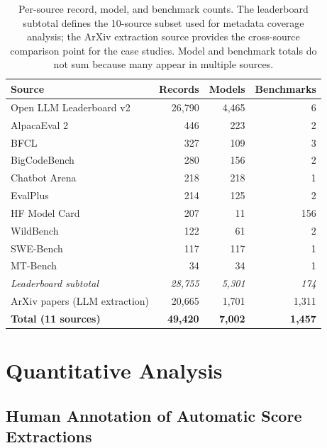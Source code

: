 \documentclass[11pt]{article}
\begin{document}
\begin{table}[t]
\centering
\small
\begin{tabular}{lrrr}
\toprule
Source & Records & Models & Benchmarks \\
\midrule
Open LLM Leaderboard v2 & 26{,}790 & 4{,}465 & 6 \\
AlpacaEval 2 & 446 & 223 & 2 \\
BFCL & 327 & 109 & 3 \\
BigCodeBench & 280 & 156 & 2 \\
Chatbot Arena & 218 & 218 & 1 \\
EvalPlus & 214 & 125 & 2 \\
HF Model Card & 207 & 11 & 156 \\
WildBench & 122 & 61 & 2 \\
SWE-Bench & 117 & 117 & 1 \\
MT-Bench & 34 & 34 & 1 \\
\midrule
\textit{Leaderboard subtotal} & \textit{28{,}755} & \textit{5{,}301} & \textit{174} \\
\midrule
ArXiv papers (LLM extraction) & 20{,}665 & 1{,}701 & 1{,}311 \\
\midrule
\textbf{Total (11 sources)} & \textbf{49{,}420} & \textbf{7{,}002} & \textbf{1{,}457} \\
\bottomrule
\end{tabular}
\caption{Per-source record, model, and benchmark counts. The leaderboard
subtotal defines the 10-source subset used for metadata coverage analysis;
the ArXiv extraction source provides the cross-source comparison point for
the case studies. Model and benchmark totals do not sum because many appear
in multiple sources.}
\label{tab:sources}
\end{table}

\section{Quantitative Analysis}
\label{sec:quant}

\subsection{Human Annotation of Automatic Score Extractions}
\label{sec:score-ann}
\end{document}
